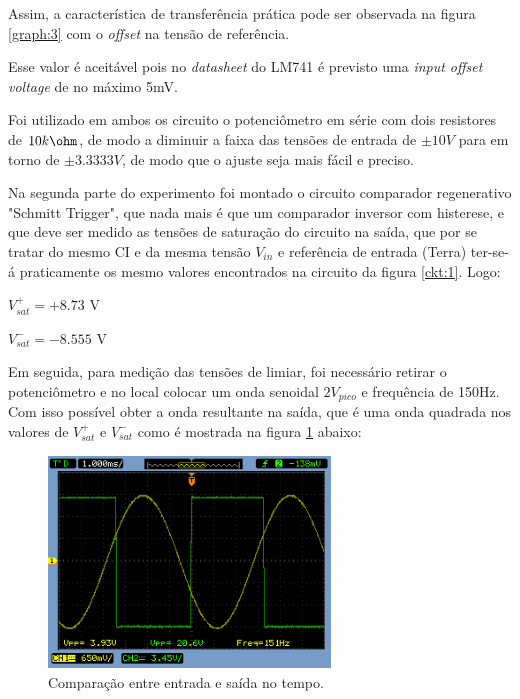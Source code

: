 Assim, a característica de transferência prática pode ser observada na figura \ref{graph:3} com o \textit{offset} na tensão de referência.



Esse valor é aceitável pois no \textit{datasheet} do LM741 é previsto uma \textit{input offset voltage} de no máximo 5mV.

Foi utilizado em ambos os circuito o potenciômetro em série com dois resistores de $10k\ohm$, de modo a diminuir a faixa das tensões de entrada de  $\pm 10V$ para em torno de  $\pm 3.3333V$, de modo que o ajuste seja mais fácil e preciso.

Na segunda parte do experimento foi montado o circuito comparador regenerativo "Schmitt Trigger", que nada mais é que um comparador inversor com histerese, e que deve ser medido as tensões de saturação do circuito na saída, que por se tratar do mesmo CI e da mesma tensão $V_{in}$ e referência de entrada (Terra) ter-se-á praticamente os mesmo valores encontrados na circuito da figura \ref{ckt:1}. Logo:

\begin{center}
        $V_{sat}^+ = +8.73$ V
\end{center}
\begin{center}
        $V_{sat}^- = -8.555$ V
\end{center}

Em seguida, para medição das tensões de limiar, foi necessário retirar o potenciômetro e no local colocar um onda senoidal $2V_{pico}$ e frequência de 150Hz. Com isso possível obter a onda resultante na saída, que é uma onda quadrada nos valores de $V_{sat}^+$ e $V_{sat}^-$ como é mostrada na figura \ref{fig1} abaixo:


\begin{figure}[H] 
\centering
\includegraphics[width=7.5cm]{images/time.png}
\caption{Comparação entre entrada e saída no tempo.}
\label{fig1} 
\end{figure}

